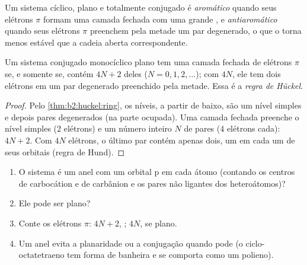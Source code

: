 \begin{definition}[Aromaticidade]\label{def:b2:huckel:aromatic}
Um sistema cíclico, plano e totalmente conjugado é \emph{aromático} quando
seus elétrons $\pi$ formam uma camada fechada com uma grande , e \emph{antiaromático} quando seus elétrons
$\pi$ preenchem pela metade um par degenerado, o que o torna menos estável que
a cadeia aberta correspondente.
\end{definition}

\begin{theorem}\label{thm:b2:huckel:huckel-rule}
Um sistema conjugado monocíclico plano tem uma camada fechada de elétrons $\pi$ se,
e somente se, contém $4N + 2$ deles ($N = 0, 1, 2, \dots$); com $4N$, ele tem
dois elétrons em um par degenerado preenchido pela metade. Essa é a
\emph{regra de Hückel}.
\end{theorem}

\begin{proof}
Pelo \cref{thm:b2:huckel:ring}, os níveis, a partir de baixo, são um nível
simples e depois pares degenerados (na parte ocupada). Uma camada fechada
preenche o nível simples (2 elétrons) e um número inteiro $N$ de pares (4
elétrons cada): $4N + 2$. Com $4N$ elétrons, o último par contém apenas dois,
um em cada um de seus orbitais (regra de Hund).
\end{proof}

\begin{method}[É aromático?]\label{met:b2:huckel:aromaticity}
\begin{enumerate}
  \item O sistema é um anel com um orbital p em cada átomo (contando os
        centros de carbocátion e de carbânion e os pares não ligantes dos
        heteroátomos)?
  \item Ele pode ser plano?
  \item Conte os elétrons $\pi$: $4N + 2$, ; $4N$,  se plano.
  \item Um anel  evita a planaridade ou a conjugação quando pode
        (o ciclo-octatetraeno tem forma de banheira e se comporta como um polieno).
\end{enumerate}
\end{method}

